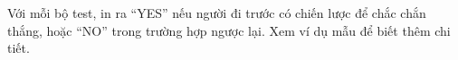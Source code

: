 Với mỗi bộ test, in ra “YES” nếu người đi trước có chiến lược để chắc chắn thắng, hoặc “NO” trong trường hợp ngược lại. Xem ví dụ mẫu để biết thêm chi tiết.